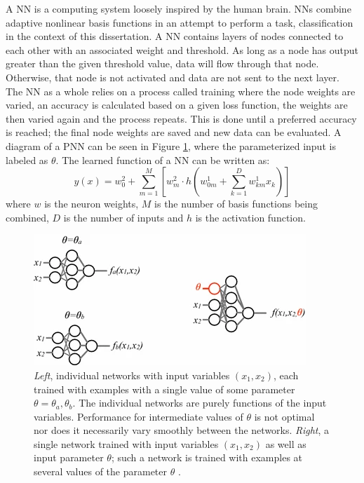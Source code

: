 		A \gls{NN} is a computing system loosely inspired by the human brain. NNs combine adaptive nonlinear basis functions in an attempt to perform a task, classification in the context of this dissertation. A NN contains layers of nodes connected to each other with an associated weight and threshold. As long as a node has output greater than the given threshold value, data will flow through that node. Otherwise, that node is not activated and data are not sent to the next layer. The NN as a whole relies on a process called training where the node weights are varied, an accuracy is calculated based on a given loss function, the weights are then varied again and the process repeats. This is done until a preferred accuracy is reached; the final node weights are saved and new data can be evaluated. A diagram of a \gls{PNN} can be seen in Figure \ref{fig:PNN-diagram}, where the parameterized input is labeled as $\theta$. The learned function of a NN can be written as:
		\begin{equation}
		y(x) = w_{0}^{2} + \sum^{M}_{m=1}[ w^{2}_{m} \cdot h (w_{0m}^{1} + \sum^{D}_{k=1} w^{1}_{km} x_{k}  )]
		\end{equation}
		where $w$ is the neuron weights, $M$ is the number of basis functions being combined, $D$ is the number of inputs and $h$ is the activation function.

		\begin{figure}	
			\begin{center}
				\includegraphics[width=.6\textwidth,keepaspectratio=true]{chapters/chapter6_HPlus/images/PNN_Diagram.png}
			\end{center}
			\caption{\textit{Left}, individual networks with input variables $(x_{1},x_{2})$, each trained with examples with a single value of some parameter $\theta = \theta_{a}, \theta_{b}$. The individual networks are purely functions of the input variables. Performance for intermediate values of $\theta$ is not optimal nor does it necessarily vary smoothly between the networks. \textit{Right}, a single network trained with input variables $(x_{1},x_{2})$ as well as input parameter $\theta$; such a network is trained with examples at several values of the parameter $\theta$ \cite{PNN}.}
			\label{fig:PNN-diagram}
		\end{figure}	

